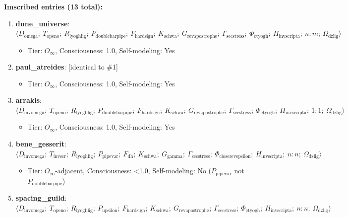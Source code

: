 \documentclass[12pt,a4paper]{article}
\begin{document}
\textbf{Imscribed entries (13 total):}

\begin{enumerate}
    \item 
    \textbf{dune\_universe}: $\langle D_{\text{omega}};\ T_{\text{openo}};\ R_{\text{lyoghlig}};\ P_{\text{doublebarpipe}};\ F_{\text{hardsign}};\ K_{\text{schwa}};\ G_{\text{revapostrophe}};\ \Gamma_{\text{secstress}};\ \Phi_{\text{ctyogh}};\ H_{\text{invscripta}};\ n{:}m;\ \Omega_{\text{dzlig}} \rangle$

    \begin{itemize}
    \item Tier: $O_{\infty}$, Consciousness: 1.0, Self-modeling: Yes
\end{itemize}

    \item 
    \textbf{paul\_atreides}: {[}identical to \#1{]}

    \begin{itemize}
    \item Tier: $O_{\infty}$, Consciousness: 1.0, Self-modeling: Yes
\end{itemize}

    \item 
    \textbf{arrakis}: $\langle D_{\text{invomega}};\ T_{\text{openo}};\ R_{\text{lyoghlig}};\ P_{\text{doublebarpipe}};\ F_{\text{hardsign}};\ K_{\text{schwa}};\ G_{\text{revapostrophe}};\ \Gamma_{\text{secstress}};\ \Phi_{\text{ctyogh}};\ H_{\text{invscripta}};\ 1{:}1;\ \Omega_{\text{dzlig}} \rangle$

    \begin{itemize}
    \item Tier: $O_{\infty}$, Consciousness: 1.0, Self-modeling: Yes
\end{itemize}

    \item 
    \textbf{bene\_gesserit}: $\langle D_{\text{invomega}};\ T_{\text{invscr}};\ R_{\text{lyoghlig}};\ P_{\text{pipevar}};\ F_{\text{dh}};\ K_{\text{schwa}};\ G_{\text{gamma}};\ \Gamma_{\text{secstress}};\ \Phi_{\text{closerevepsilon}};\ H_{\text{invscripta}};\ n{:}n;\ \Omega_{\text{dzlig}} \rangle$

    \begin{itemize}
    \item Tier: $O_{\infty}$-adjacent, Consciousness: \textless{}1.0, Self-modeling: No ($P_{\text{pipevar}}$ not $P_{\text{doublebarpipe}}$)
\end{itemize}

    \item 
    \textbf{spacing\_guild}: $\langle D_{\text{invomega}};\ T_{\text{openo}};\ R_{\text{lyoghlig}};\ P_{\text{upsilon}};\ F_{\text{hardsign}};\ K_{\text{schwa}};\ G_{\text{revapostrophe}};\ \Gamma_{\text{secstress}};\ \Phi_{\text{ctyogh}};\ H_{\text{invscripta}};\ n{:}n;\ \Omega_{\text{dzlig}} \rangle$


\end{enumerate}
\end{document}
